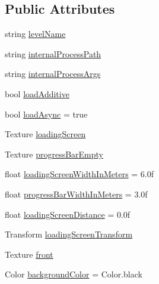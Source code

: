 \subsection*{Public Attributes}
\begin{DoxyCompactItemize}
\item 
string \mbox{\hyperlink{class_valve_1_1_v_r_1_1_steam_v_r___load_level_ac07ec4814e60ad5c6ccae6ed9d596ba5}{level\+Name}}
\item 
string \mbox{\hyperlink{class_valve_1_1_v_r_1_1_steam_v_r___load_level_a88826d505c93cf3901bd9205b3241638}{internal\+Process\+Path}}
\item 
string \mbox{\hyperlink{class_valve_1_1_v_r_1_1_steam_v_r___load_level_a803bdef44067d35c1ac7f42e88e5468f}{internal\+Process\+Args}}
\item 
bool \mbox{\hyperlink{class_valve_1_1_v_r_1_1_steam_v_r___load_level_a3f5f4bf18ba7aefcf0c6fdecbb123b33}{load\+Additive}}
\item 
bool \mbox{\hyperlink{class_valve_1_1_v_r_1_1_steam_v_r___load_level_ae05b17c8b80f005d9c6680e7e3509665}{load\+Async}} = true
\item 
Texture \mbox{\hyperlink{class_valve_1_1_v_r_1_1_steam_v_r___load_level_a24191ab16ec7437a80867d87e637e9e3}{loading\+Screen}}
\item 
Texture \mbox{\hyperlink{class_valve_1_1_v_r_1_1_steam_v_r___load_level_ac24427f0e2b7fad8df5d3c9c64726db9}{progress\+Bar\+Empty}}
\item 
float \mbox{\hyperlink{class_valve_1_1_v_r_1_1_steam_v_r___load_level_a18434a86860d0950b709a0090e6d89eb}{loading\+Screen\+Width\+In\+Meters}} = 6.\+0f
\item 
float \mbox{\hyperlink{class_valve_1_1_v_r_1_1_steam_v_r___load_level_ab40ac35782bff5b0b4fde9caec4753db}{progress\+Bar\+Width\+In\+Meters}} = 3.\+0f
\item 
float \mbox{\hyperlink{class_valve_1_1_v_r_1_1_steam_v_r___load_level_a7608fc39bc1501a37bc12b101fa60eaa}{loading\+Screen\+Distance}} = 0.\+0f
\item 
Transform \mbox{\hyperlink{class_valve_1_1_v_r_1_1_steam_v_r___load_level_adb958a39d324ca7aa7391594afd1e65c}{loading\+Screen\+Transform}}
\item 
Texture \mbox{\hyperlink{class_valve_1_1_v_r_1_1_steam_v_r___load_level_a95d45adace3d6ec6b590e841229cb042}{front}}
\item 
Color \mbox{\hyperlink{class_valve_1_1_v_r_1_1_steam_v_r___load_level_a663bf9934d6ce7f601189b6507bdfd2c}{background\+Color}} = Color.\+black
\item 

\end{DoxyCompactItemize}
